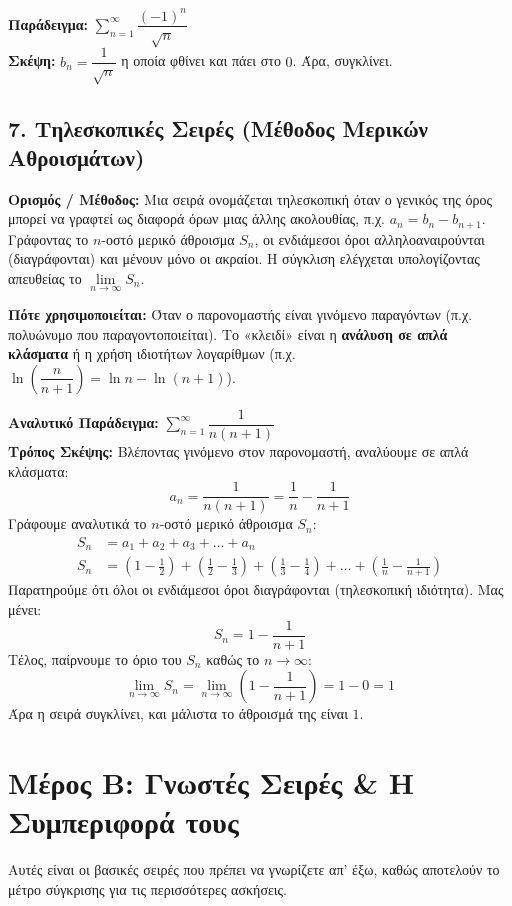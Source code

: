 \documentclass[11pt,a4paper]{article}
\begin{document}
\vspace{0.2cm}
\noindent \textbf{Παράδειγμα:} $\displaystyle\sum_{n=1}^{\infty} \dfrac{(-1)^n}{\sqrt{n}}$ \\
\textbf{Σκέψη:} $b_n = \dfrac{1}{\sqrt{n}}$ η οποία φθίνει και πάει στο $0$. Άρα, συγκλίνει.
\subsection*{7. Τηλεσκοπικές Σειρές (Μέθοδος Μερικών Αθροισμάτων)}
\textbf{Ορισμός / Μέθοδος:} Μια σειρά ονομάζεται τηλεσκοπική όταν ο γενικός της όρος μπορεί να γραφτεί ως διαφορά όρων μιας άλλης ακολουθίας, π.χ. $a_n = b_n - b_{n+1}$. Γράφοντας το $n$-οστό μερικό άθροισμα $S_n$, οι ενδιάμεσοι όροι αλληλοαναιρούνται (διαγράφονται) και μένουν μόνο οι ακραίοι. Η σύγκλιση ελέγχεται υπολογίζοντας απευθείας το $\lim\limits_{n \to \infty} S_n$.

\vspace{0.2cm}
\noindent \textbf{Πότε χρησιμοποιείται:} Όταν ο παρονομαστής είναι γινόμενο παραγόντων (π.χ. πολυώνυμο που παραγοντοποιείται). Το «κλειδί» είναι η \textbf{ανάλυση σε απλά κλάσματα} ή η χρήση ιδιοτήτων λογαρίθμων (π.χ. $\ln\left(\dfrac{n}{n+1}\right) = \ln n - \ln(n+1)$).

\vspace{0.2cm}
\noindent \textbf{Αναλυτικό Παράδειγμα:} $\displaystyle\sum_{n=1}^{\infty} \dfrac{1}{n(n+1)}$ \\
\textbf{Τρόπος Σκέψης:} Βλέποντας γινόμενο στον παρονομαστή, αναλύουμε σε απλά κλάσματα:
\[ a_n = \frac{1}{n(n+1)} = \frac{1}{n} - \frac{1}{n+1} \]
Γράφουμε αναλυτικά το $n$-οστό μερικό άθροισμα $S_n$:
\begin{align*}
S_n &= a_1 + a_2 + a_3 + \dots + a_n \\
S_n &= \left( 1 - \frac{1}{2} \right) + \left( \frac{1}{2} - \frac{1}{3} \right) + \left( \frac{1}{3} - \frac{1}{4} \right) + \dots + \left( \frac{1}{n} - \frac{1}{n+1} \right)
\end{align*}
Παρατηρούμε ότι όλοι οι ενδιάμεσοι όροι διαγράφονται (τηλεσκοπική ιδιότητα). Μας μένει:
\[ S_n = 1 - \frac{1}{n+1} \]
Τέλος, παίρνουμε το όριο του $S_n$ καθώς το $n \to \infty$:
\[ \lim_{n \to \infty} S_n = \lim_{n \to \infty} \left( 1 - \frac{1}{n+1} \right) = 1 - 0 = 1 \]
Άρα η σειρά συγκλίνει, και μάλιστα το άθροισμά της είναι $1$.
\hrulefill

\section*{Μέρος Β: Γνωστές Σειρές \& Η Συμπεριφορά τους}
Αυτές είναι οι βασικές σειρές που πρέπει να γνωρίζετε απ' έξω, καθώς αποτελούν το μέτρο σύγκρισης για τις περισσότερες ασκήσεις.
\end{document}

